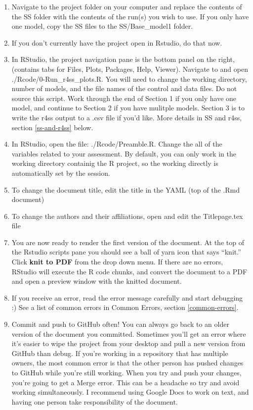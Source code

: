 \documentclass[12pt,]{article}
\begin{document}
\begin{enumerate}
\def\labelenumi{\arabic{enumi}.}
\item
  Navigate to the project folder on your computer and replace the
  contents of the SS folder with the contents of the run(s) you wish to
  use. If you only have one model, copy the SS files to the
  SS/Base\_model1 folder.
\item
  If you don't currently have the project open in Rstudio, do that now.
\item
  In RStudio, the project navigation pane is the bottom panel on the
  right, (contains tabs for Files, Plots, Packages, Help, Viewer).
  Navigate to and open ./Rcode/0-Run\_r4ss\_plots.R. You will need to
  change the working directory, number of models, and the file names of
  the control and data files. Do not source this script. Work through
  the end of Section 1 if you only have one model, and continue to
  Section 2 if you have mulitple models. Section 3 is to write the r4ss
  output to a .csv file if you'd like. More details in SS and r4ss,
  section \ref{ss-and-r4ss} below.
\item
  In RStudio, open the file: ./Rcode/Preamble.R. Change the all of the
  variables related to your assessment. By default, you can only work in
  the working directory containig the R project, so the working directly
  is automatically set by the session.
\item
  To change the document title, edit the title in the YAML (top of the
  .Rmd document)
\item
  To change the authors and their affiliations, open and edit the
  Titlepage.tex file
\item
  You are now ready to render the first version of the document. At the
  top of the Rstudio scripts pane you should see a ball of yarn icon
  that says ``knit.'' Click \textbf{knit to PDF} from the drop down
  menu. If there are no errors, RStudio will execute the R code chunks,
  and convert the document to a PDF and open a preview window with the
  knitted document.
\item
  If you receive an error, read the error message carefully and start
  debugging :) See a list of common errors in Common Errors, section
  \ref{common-errors}.
\item
  Commit and push to GitHub often! You can always go back to an older
  version of the document you committed. Sometimes you'll get an error
  where it's easier to wipe the project from your desktop and pull a new
  version from GitHub than debug. If you're working in a repository that
  has multiple owners, the most common error is that the other person
  has pushed changes to GitHub while you're still working. When you try
  and push your changes, you're going to get a Merge error. This can be
  a headache so try and avoid working simultaneously. I recommend using
  Google Docs to work on text, and having one person take responsibility
  of the document.
\end{enumerate}
\end{document}
